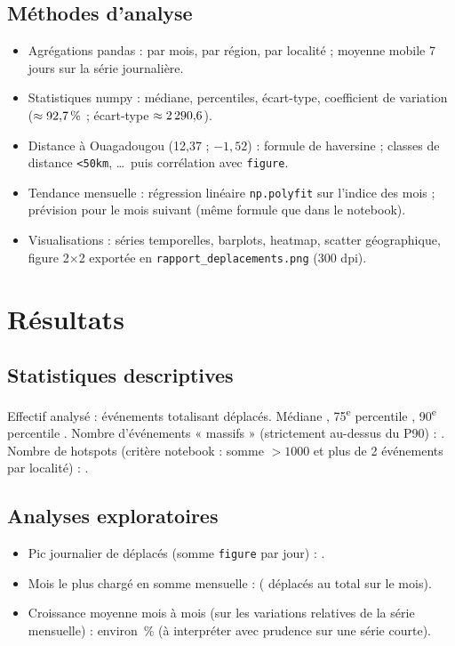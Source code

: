 \documentclass[11pt,a4paper]{report}
\begin{document}
\section{Méthodes d'analyse}
\begin{itemize}
  \item Agrégations pandas : par mois, par région, par localité ; moyenne mobile 7 jours sur la série
  journalière.
  \item Statistiques numpy : médiane, percentiles, écart-type, coefficient de variation
  (\(\approx 92{,}7{}\,\%\) ; écart-type \(\approx 2\,290{,}6{}\)).
  \item Distance à Ouagadougou (12{,}37 ; $-1{,}52$) : formule de haversine ; classes de distance
  \texttt{<50km}, \ldots\ puis corrélation avec \texttt{figure}.
  \item Tendance mensuelle : régression linéaire \texttt{np.polyfit} sur l'indice des mois ;
  prévision pour le mois suivant (même formule que dans le notebook).
  \item Visualisations : séries temporelles, barplots, heatmap, scatter géographique, figure 2$\times$2
  exportée en \texttt{rapport\_deplacements.png} (300 dpi).
\end{itemize}

\chapter{Résultats}

\section{Statistiques descriptives}
Effectif analysé : \EventsGeo{} événements totalisant \TotalDeplaces{} déplacés. Médiane \MedianeEvt{},
75\textsuperscript{e} percentile \PcentVingtCinq{}, 90\textsuperscript{e} percentile
\PcentQuatreVingtDix{}. Nombre d'événements « massifs » (strictement au-dessus du P90) : \NbMassifs{}.
Nombre de hotspots (critère notebook : somme $>1000$ et plus de 2 événements par localité) :
\NbHotspots{}.

\section{Analyses exploratoires}
\begin{itemize}
  \item Pic journalier de déplacés (somme \texttt{figure} par jour) : \DailyMax{}.
  \item Mois le plus chargé en somme mensuelle : \MoisMax{} (\MoisMaxVal{} déplacés au total sur le mois).
  \item Croissance moyenne mois à mois (sur les variations relatives de la série mensuelle) :
  environ \CroissanceMoyPct{}\,\% (à interpréter avec prudence sur une série courte).
\end{itemize}
\end{document}
